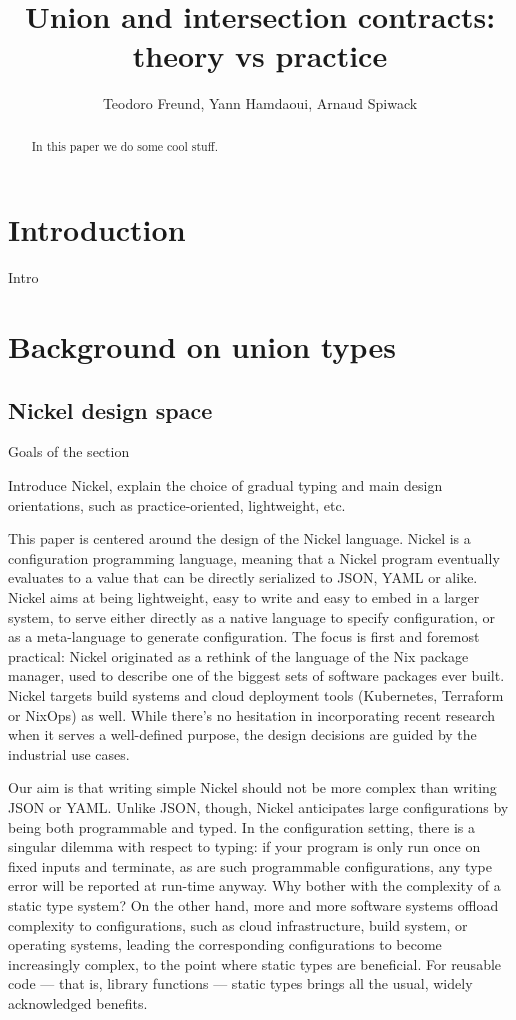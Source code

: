 \documentclass{article}
\title{Union and intersection contracts: theory vs practice}
\author{Teodoro Freund, Yann Hamdaoui, Arnaud Spiwack}
\begin{document}
\maketitle

\begin{abstract}
 In this paper we do some cool stuff.
\end{abstract}

\section*{Introduction}
Intro

\section{Background on union types}

\subsection{Nickel design space}

\color{red}Goals of the section

Introduce Nickel, explain the choice of gradual
typing and main design orientations, such as practice-oriented, lightweight,
etc.\vspace{0.5cm}\color{black}

This paper is centered around the design of the Nickel
language\cite{NickelRepo}. Nickel is a configuration programming language,
meaning that a Nickel program eventually evaluates to a value that can be
directly serialized to JSON, YAML or alike.  Nickel aims at being lightweight,
easy to write and easy to embed in a larger system, to serve either directly as
a native language to specify configuration, or as a meta-language to generate
configuration. The focus is first and foremost practical: Nickel originated as a
rethink of the language of the Nix package manager, used to describe one of the
biggest sets of software packages ever built\cite{repology}.
Nickel targets build systems and cloud deployment tools (Kubernetes, Terraform or
NixOps) as well.  While there's no hesitation in incorporating recent research
when it serves a well-defined purpose, the design decisions are guided by the
industrial use cases.

Our aim is that writing simple Nickel should not be more complex than writing
JSON or YAML. Unlike JSON, though, Nickel anticipates large configurations by
being both programmable and typed. In the configuration setting, there is a
singular dilemma with respect to typing: if your program is only run once on
fixed inputs and terminate, as are such programmable configurations, any type
error will be reported at run-time anyway. Why bother with the complexity of a
static type system? On the other hand, more and more software systems offload
complexity to configurations, such as cloud infrastructure, build system, or
operating systems, leading the corresponding configurations to become
increasingly complex, to the point where static types are beneficial. For
reusable code — that is, library functions — static types brings all the usual,
widely acknowledged benefits.
\end{document}
